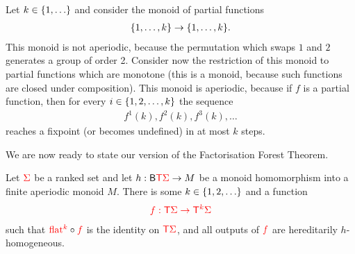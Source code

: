 \begin{example}\label{ex:partial-monoton-functions}
   Let $k \in \{1,\ldots\}$ and  consider the monoid of partial functions 
    \begin{align*}
    \{1,\ldots,k\} \to \{1,\ldots,k\}.
    \end{align*}
    This monoid is not aperiodic, because the permutation which swaps $1$ and $2$ generates a group of order 2. Consider now the restriction of this monoid to partial functions which are monotone (this is a monoid, because such functions are closed under composition). This monoid is aperiodic, because if $f$ is a partial function, then for  every $i \in \{1,2,\ldots,k\}$ the sequence
    \begin{align*}
    f^1(k),f^2(k),f^3(k),\ldots
    \end{align*}
    reaches a fixpoint (or becomes undefined) in at most $k$ steps.
\end{example}
We are now ready to state our version of the Factorisation Forest Theorem. 
\begin{theorem}\label{thm:factfor}
    Let ${\color{red}{\Sigma}}$ be a  ranked set and let $h : \mathsf{B} {\color{red}{\mathsf T}} {\color{red}{\Sigma}} \to M$ be a monoid homomorphism into a finite aperiodic monoid $M$. There is some $k \in \{1,2,\ldots\}$ and a  function
    \begin{align*}
        {\color{red}{f : {\color{red}{\mathsf T}}{\color{red}{\Sigma}}\to {\color{red}{\mathsf T}}^k {\color{red}{\Sigma}}}}  
    \end{align*}
such that ${\color{red}{\mathrm{flat}}}^{{\color{red}{k}}} \circ {\color{red}{f}}$ is the identity on ${\color{red}{\mathsf T}} {\color{red}{\Sigma}}$, and  all outputs of  ${\color{red}{f}}$ are hereditarily $h$-homogeneous.
\end{theorem}




